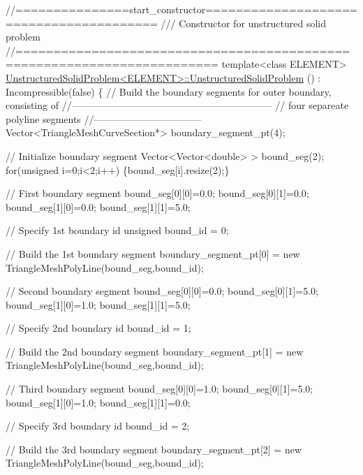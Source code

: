  
\begin{DoxyCodeInclude}
\textcolor{comment}{//===============start\_constructor========================================}
\textcolor{comment}{/// Constructor for unstructured solid problem}
\textcolor{comment}{}\textcolor{comment}{//========================================================================}
\textcolor{keyword}{template}<\textcolor{keyword}{class} ELEMENT>
\hyperlink{classUnstructuredSolidProblem_a18ce02b6e4bbc86403c9e1b32c095772}{UnstructuredSolidProblem<ELEMENT>::UnstructuredSolidProblem}
      () :
 Incompressible(false)
\{  
 \textcolor{comment}{// Build the boundary segments for outer boundary, consisting of}
 \textcolor{comment}{//--------------------------------------------------------------}
 \textcolor{comment}{// four separeate polyline segments}
 \textcolor{comment}{//---------------------------------}
 Vector<TriangleMeshCurveSection*> boundary\_segment\_pt(4);
 
 \textcolor{comment}{// Initialize boundary segment}
 Vector<Vector<double> > bound\_seg(2);
 \textcolor{keywordflow}{for}(\textcolor{keywordtype}{unsigned} i=0;i<2;i++) \{bound\_seg[i].resize(2);\}
 
 \textcolor{comment}{// First boundary segment}
 bound\_seg[0][0]=0.0;
 bound\_seg[0][1]=0.0;
 bound\_seg[1][0]=0.0;
 bound\_seg[1][1]=5.0;
 
 \textcolor{comment}{// Specify 1st boundary id}
 \textcolor{keywordtype}{unsigned} bound\_id = 0;

 \textcolor{comment}{// Build the 1st boundary segment}
 boundary\_segment\_pt[0] = \textcolor{keyword}{new} TriangleMeshPolyLine(bound\_seg,bound\_id);
 
 \textcolor{comment}{// Second boundary segment}
 bound\_seg[0][0]=0.0;
 bound\_seg[0][1]=5.0;
 bound\_seg[1][0]=1.0;
 bound\_seg[1][1]=5.0;

 \textcolor{comment}{// Specify 2nd boundary id}
 bound\_id = 1;

 \textcolor{comment}{// Build the 2nd boundary segment}
 boundary\_segment\_pt[1] = \textcolor{keyword}{new} TriangleMeshPolyLine(bound\_seg,bound\_id);

 \textcolor{comment}{// Third boundary segment}
 bound\_seg[0][0]=1.0;
 bound\_seg[0][1]=5.0;
 bound\_seg[1][0]=1.0;
 bound\_seg[1][1]=0.0;

 \textcolor{comment}{// Specify 3rd boundary id}
 bound\_id = 2;

 \textcolor{comment}{// Build the 3rd boundary segment}
 boundary\_segment\_pt[2] = \textcolor{keyword}{new} TriangleMeshPolyLine(bound\_seg,bound\_id);


\end{DoxyCodeInclude}
